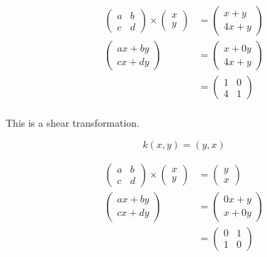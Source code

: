 \documentclass{tufte-handout}
\begin{document}
\begin{question}
\begin{align*}
    \begin{pmatrix}
        a & b \\
        c & d
    \end{pmatrix}
    \times
    \begin{pmatrix}
        x \\
        y
    \end{pmatrix}
    &=
    \begin{pmatrix}
        x + y\\
        4x + y
    \end{pmatrix}\\[8pt]
    \begin{pmatrix}
        ax + by \\
        cx + dy
    \end{pmatrix}
    &=
    \begin{pmatrix}
        x + 0y\\
        4x + y
    \end{pmatrix}\\[8pt]
    &=
    \begin{pmatrix}
        1 & 0\\
        4 & 1
    \end{pmatrix}\\
\end{align*}

This is a shear transformation.

\vspace{4cm}
\qsubpart

\[ k(x,y) = (y,x) \]

\begin{align*}
    \begin{pmatrix}
        a & b \\
        c & d
    \end{pmatrix}
    \times
    \begin{pmatrix}
        x \\
        y
    \end{pmatrix}
    &=
    \begin{pmatrix}
        y\\
        x
    \end{pmatrix}\\[8pt]
    \begin{pmatrix}
        ax + by \\
        cx + dy
    \end{pmatrix}
    &=
    \begin{pmatrix}
        0x + y\\
        x + 0y
    \end{pmatrix}\\[8pt]
    &=
    \begin{pmatrix}
        0 & 1\\
        1 & 0
    \end{pmatrix}\\
\end{align*}


\end{question}
\end{document}
